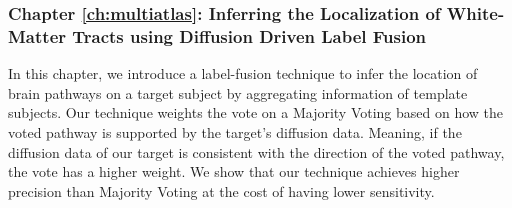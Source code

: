 \subsubsection{Chapter \ref{ch:multiatlas}: Inferring the Localization of White-Matter Tracts using Diffusion Driven Label Fusion}
In this chapter, we introduce a label-fusion technique to infer the location of
brain pathways on a target subject by aggregating information of template subjects.
Our technique weights the vote on a Majority Voting based on how the
voted pathway is supported by the target's diffusion data. Meaning, if the
diffusion data of our target is consistent with the direction of the voted pathway,
the vote has a higher weight. We show that
our technique achieves higher precision than Majority Voting at the cost of
having lower sensitivity.


